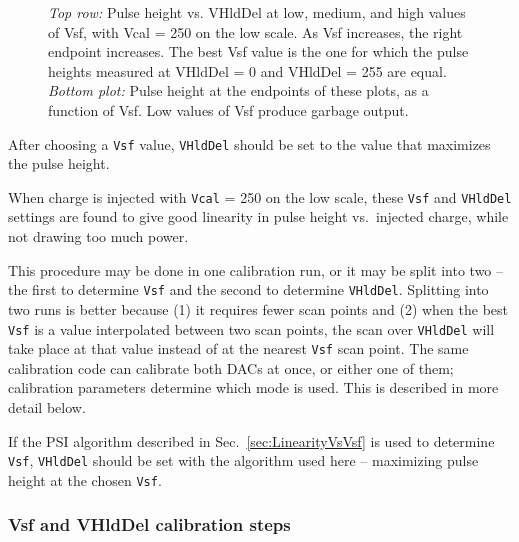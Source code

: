 \begin{figure}
\begin{center}
\end{center}
\caption{\emph{Top row:} Pulse height vs. VHldDel at low, medium, and high values of Vsf, with Vcal = 250 on the low scale.  As Vsf increases, the right endpoint increases.  The best Vsf value is the one for which the pulse heights measured at VHldDel = 0 and VHldDel = 255 are equal.  \emph{Bottom plot:} Pulse height at the endpoints of these plots, as a function of Vsf.  Low values of Vsf produce garbage output.}
\label{fig:PHvsVHldDel}
\end{figure}

After choosing a \verb|Vsf| value, \verb|VHldDel| should be set to the value that maximizes the pulse height.

When charge is injected with \verb|Vcal| = 250 on the low scale, these \verb|Vsf| and \verb|VHldDel| settings are found to give good linearity in pulse height vs.~injected charge, while not drawing too much power.

This procedure may be done in one calibration run, or it may be split into two -- the first to determine \verb|Vsf| and the second to determine \verb|VHldDel|.  Splitting into two runs is better because (1) it requires fewer scan points and (2) when the best \verb|Vsf| is a value interpolated between two scan points, the scan over \verb|VHldDel| will take place at that value instead of at the nearest \verb|Vsf| scan point.  The same calibration code can calibrate both DACs at once, or either one of them; calibration parameters determine which mode is used.  This is described in more detail below.

If the PSI algorithm described in Sec.~\ref{sec:LinearityVsVsf} is used to determine \verb|Vsf|, \verb|VHldDel| should be set with the algorithm used here -- maximizing pulse height at the chosen \verb|Vsf|.

\subsubsection{Vsf and VHldDel calibration steps}

